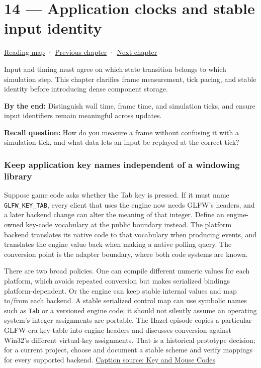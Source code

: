\hypertarget{05-engine-i-ch014}{}
\chapter{14 --- Application clocks and stable input identity}\label{05-engine-i-ch014-application-clocks-and-stable-input-identity}

\hyperref[volume-reading-map]{Reading map} · \hyperref[05-engine-i-ch013]{Previous chapter} · \hyperref[05-engine-i-ch015]{Next chapter}

Input and timing must agree on which state transition belongs to which simulation step. This chapter clarifies frame measurement, tick pacing, and stable identity before introducing dense component storage.

\textbf{By the end:} Distinguish wall time, frame time, and simulation ticks, and ensure input identifiers remain meaningful across updates.

\textbf{Recall question:} How do you measure a frame without confusing it with a simulation tick, and what data lets an input be replayed at the correct tick?

\subsection{Keep application key names independent of a windowing library}\label{05-engine-i-ch014-keep-application-key-names-independent-of-a-windowing-library}

Suppose game code asks whether the Tab key is pressed. If it must name \texttt{GLFW\_KEY\_TAB}, every client that uses the engine now needs GLFW's headers, and a later backend change can alter the meaning of that integer. Define an engine-owned key-code vocabulary at the public boundary instead. The platform backend translates its native code to that vocabulary when producing events, and translates the engine value back when making a native polling query. The conversion point is the adapter boundary, where both code systems are known.

There are two broad policies. One can compile different numeric values for each platform, which avoids repeated conversion but makes serialized bindings platform-dependent. Or the engine can keep stable internal values and map to/from each backend. A stable serialized control map can use symbolic names such as \texttt{Tab} or a versioned engine code; it should not silently assume an operating system's integer assignments are portable. The Hazel episode copies a particular GLFW-era key table into engine headers and discusses conversion against Win32's different virtual-key assignments. That is a historical prototype decision; for a current project, choose and document a stable scheme and verify mappings for every supported backend. \href{https://www.youtube.com/watch?v=zaJGn8pur5I}{Caption source: Key and Mouse Codes}

